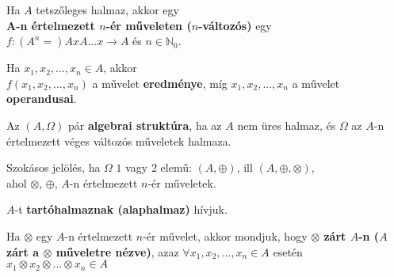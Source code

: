 \begin{frame}
\begin{tcolorbox}[title={Def.:Algebrai struktúrák, izomorfiájuk}]
Ha $A$ tetszőleges halmaz, akkor egy\\
\textbf{A-n értelmezett $n$-ér műveleten ($n$-változós)} egy\\
$f : (A^n =) A x A ... x \rightarrow A$ és $n \in \mathbb{N}_0$.\\
\msmallskip

Ha $x_1, x_2, ..., x_n\in A$, akkor\\
$f(x_1, x_2, ..., x_n)$ a művelet \textbf{eredménye}, míg $x_1, x_2, ..., x_n$ a művelet \textbf{operandusai}.\\
\msmallskip

Az $(A, {\Omega})$ pár \textbf{algebrai struktúra}, ha az $A$ nem üres halmaz, és $\Omega$ az $A$-n értelmezett véges változós műveletek halmaza.\\
\msmallskip

Szokásos jelölés, ha $\Omega$ $1$ vagy $2$ elemű: $(A, {\oplus})$, ill $(A, {\oplus}, {\otimes})$,\\
ahol $\otimes$, $\oplus$, $A$-n értelmezett $n$-ér műveletek.\\
\msmallskip

$A$-t \textbf{tartóhalmaznak (alaphalmaz)} hívjuk.
\end{tcolorbox}

\begin{tcolorbox}[title={Def.: Műveleti zártság}]
Ha $\otimes$ egy $A$-n értelmezett $n$-ér művelet, akkor mondjuk, hogy \textbf{${\otimes}$ zárt $A$-n ($A$ zárt a ${\otimes}$ műveletre nézve)}, azaz ${\forall}x_1, x_2, ..., x_n \in A$ esetén $x_1 \otimes x_2 \otimes ... \otimes x_n \in A$
\end{tcolorbox}
\end{frame}

